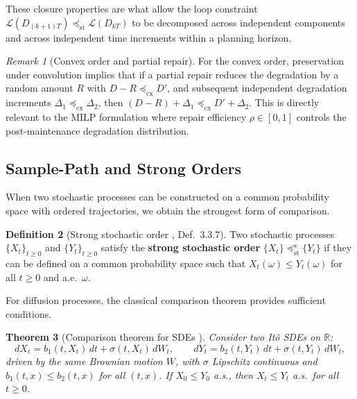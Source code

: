 \documentclass[11pt,a4paper]{article}
\theoremstyle{plain}
\newtheorem{theorem}{Theorem}[section]
\theoremstyle{definition}
\newtheorem{definition}[theorem]{Definition}
\theoremstyle{remark}
\newtheorem{remark}[theorem]{Remark}
\begin{document}
These closure properties are what allow the loop constraint
$\mathcal{L}(D_{(k+1)T}) \preceq_{\mathrm{st}} \mathcal{L}(D_{kT})$ to be
decomposed across independent components and across independent time increments
within a planning horizon.

\begin{remark}[Convex order and partial repair]
\label{rem:convex_repair}
For the convex order, preservation under convolution implies that if a partial repair
reduces the degradation by a random amount $R$ with
$D - R \preceq_{\mathrm{cx}} D'$, and subsequent independent degradation increments
$\Delta_1 \preceq_{\mathrm{cx}} \Delta_2$, then
$(D - R) + \Delta_1 \preceq_{\mathrm{cx}} D' + \Delta_2$.
This is directly relevant to the MILP formulation where repair efficiency
$\rho \in [0,1]$ controls the post-maintenance degradation distribution.
\end{remark}

\subsection{Sample-Path and Strong Orders}
\label{sec:micro:samplepath}

When two stochastic processes can be constructed on a common probability space with
ordered trajectories, we obtain the strongest form of comparison.

\begin{definition}[Strong stochastic order {\cite{muller2002}, Def.~3.3.7}]
\label{def:strong_order}
Two stochastic processes $\{X_t\}_{t \geq 0}$ and $\{Y_t\}_{t \geq 0}$ satisfy the
\textbf{strong stochastic order} $\{X_t\} \preceq_{\mathrm{st}}^{\mathrm{s}} \{Y_t\}$
if they can be defined on a common probability space such that
$X_t(\omega) \leq Y_t(\omega)$ for all $t \geq 0$ and a.e.\ $\omega$.
\end{definition}

For diffusion processes, the classical comparison theorem provides sufficient
conditions.

\begin{theorem}[Comparison theorem for SDEs {\cite{ikeda1977}}]
\label{thm:sde_comparison}
Consider two It\^o SDEs on $\mathbb{R}$:
\begin{equation}
  dX_t = b_1(t, X_t)\,dt + \sigma(t, X_t)\,dW_t, \qquad
  dY_t = b_2(t, Y_t)\,dt + \sigma(t, Y_t)\,dW_t,
\end{equation}
driven by the \emph{same} Brownian motion $W$, with $\sigma$ Lipschitz continuous
and $b_1(t,x) \leq b_2(t,x)$ for all $(t,x)$.  If $X_0 \leq Y_0$ a.s., then
$X_t \leq Y_t$ a.s.\ for all $t \geq 0$.
\end{theorem}
\end{document}
